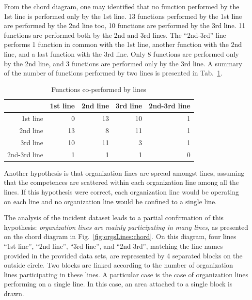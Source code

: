 \documentclass[lnbip]{svmultln}
\begin{document}
From the chord diagram, one may identified that no function performed by the 1st line is performed only by the 1st line. 13 functions performed by the 1st line are performed by the 2nd line too, 10 functions are performed by the 3rd line. 11 functions are performed both by the 2nd and 3rd lines. The ``2nd-3rd'' line performs 1 function in common with the 1st line, another function with the 2nd line, and a last function with the 3rd line. Only 8 functions are performed only by the 2nd line, and 3 functions are performed only by the 3rd line. 
A summary of the number of functions performed by two lines is presented in Tab.~\ref{tab:functionsBySTs}.

\begin{table}
\caption{Functions co-performed by lines}
\label{tab:functionsBySTs}
\begin{center}
\begin{tabular}{rrrrr}
& 1st line & 2nd line & 3rd line & 2nd-3rd line \\[2pt]
\hline\rule{0pt}{12pt}
1st line	   &  0 & 13 & 10 & 1\\
2nd line     & 13 &  8 & 11 & 1\\
3rd line     & 10 & 11 &  3 & 1\\
2nd-3rd line &  1 &  1 &  1 & 0\\[2pt]
\hline
\end{tabular}
\end{center}
\end{table}

Another hypothesis is that organization lines are spread amongst lines, assuming that the competences are scattered within each organization line among all the lines. If this hypothesis were correct, each organization line would be operating on each line and no organization line would be confined to a single line.

The analysis of the incident dataset leads to a partial confirmation of this hypothesis: \emph{organization lines are mainly participating in many lines}, as presented on the chord diagram in Fig.~\ref{fig:orgsLines:chord}. On this diagram, four lines ``1st line'', ``2nd line'', ``3rd line'', and ``2nd-3rd'', matching the line names provided in the provided data sets, are represented by 4 separated blocks on the outside circle. Two blocks are linked according to the number of organization lines participating in these lines. A particular case is the case of organization lines performing on a single line. In this case, an area attached to a single block is drawn.
\end{document}
